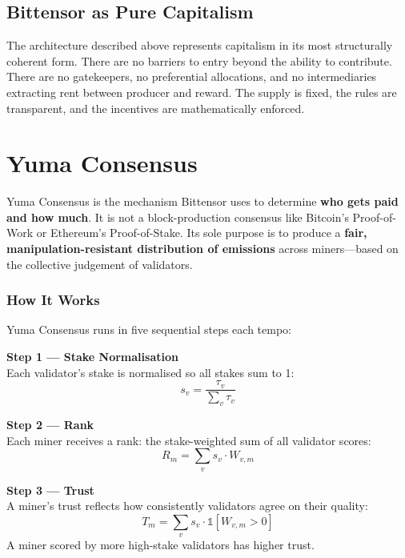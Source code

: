 \documentclass[12pt, a4paper, oneside]{report}
\theoremstyle{definition}
\begin{document}
\subsection{Bittensor as Pure Capitalism}

The architecture described above represents capitalism in its most structurally 
coherent form. There are no barriers to entry beyond the ability to contribute. 
There are no gatekeepers, no preferential allocations, and no intermediaries 
extracting rent between producer and reward. The supply is fixed, the rules are 
transparent, and the incentives are mathematically enforced.\\[0.4cm]











\section{Yuma Consensus}

Yuma Consensus is the mechanism Bittensor uses to determine \textbf{who gets paid 
and how much}. It is not a block-production consensus like Bitcoin's Proof-of-Work 
or Ethereum's Proof-of-Stake. Its sole purpose is to produce a \textbf{fair, 
manipulation-resistant distribution of emissions} across miners—based on the 
collective judgement of validators.\\[0.4cm]

\subsubsection*{How It Works}


Yuma Consensus runs in five sequential steps each tempo:

\textbf{Step 1 — Stake Normalisation}\\
Each validator's stake is normalised so all stakes sum to 1:
\[
  s_v = \frac{\tau_v}{\sum_{v} \tau_v}
\]

\textbf{Step 2 — Rank}\\
Each miner receives a rank: the stake-weighted sum of all validator scores:
\[
  R_m = \sum_{v} s_v \cdot W_{v,m}
\]

\textbf{Step 3 — Trust}\\
A miner's trust reflects how consistently validators agree on their quality:
\[
  T_m = \sum_{v} s_v \cdot \mathbb{1}\left[W_{v,m} > 0\right]
\]
A miner scored by more high-stake validators has higher trust.\\[0.4cm]
\end{document}
